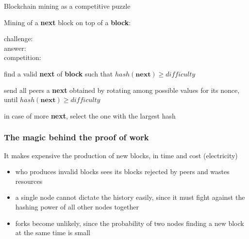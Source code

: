 \documentclass[11pt]{beamer}  %
\newcommand{\hash}{{\mathit{hash}}}
\newcommand{\difficulty}{{\mathit{difficulty}}}
\begin{document}
\begin{frame}{Blockchain mining as a competitive puzzle}

  Mining of a \textbf{next} block on top of a \textbf{block}:
  \quad{}

  \begin{description}
  \item[{\color{red}challenge:}] 
  \item[{\color{red}answer:}] 
  \item[{\color{red}competition:}] 
  \end{description}

  \bigskip
  \begin{description}
  \item<6->[{\color{red}challenge:}] find a valid \textbf{next} of \textbf{block}
    such that $\hash(\mathbf{next})\ge\difficulty$
  \item<7->[{\color{red}answer:}] send all peers a \textbf{next} obtained
    by rotating among possible values for its nonce, until $\hash(\mathbf{next})\ge\difficulty$
  \item<8->[{\color{red}competition:}] in case of more \textbf{next}, select the one with the largest hash
  \end{description}

\end{frame}

\begin{frame}\frametitle{The magic behind the proof of work}

  \begin{greenbox}{}
    It makes expensive the production of new blocks, in time and cost (electricity)
    \begin{itemize}
    \item who produces invalid blocks sees its blocks rejected by peers and wastes resources
    \item a single node cannot dictate the history easily, since it must fight against
      the hashing power of all other nodes together
    \item forks become unlikely, since the probability of two nodes finding a new block at the same time is small
    \end{itemize}
  \end{greenbox}

\end{frame}
\end{document}
